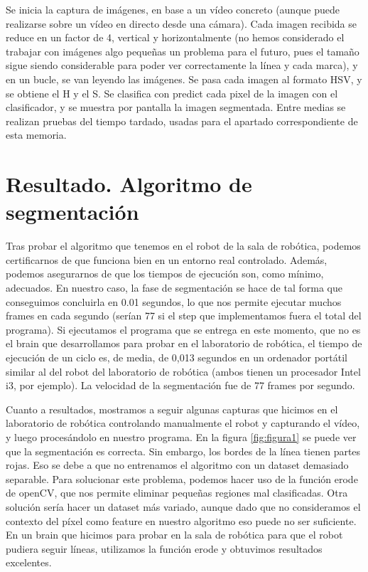 \documentclass{article}
\begin{document}
	Se inicia la captura de imágenes, en base a un vídeo concreto (aunque puede realizarse sobre un vídeo en directo desde una cámara). Cada imagen recibida se reduce en un factor de 4, vertical y horizontalmente (no hemos considerado el trabajar con imágenes algo pequeñas un problema para el futuro, pues el tamaño sigue siendo considerable para poder ver correctamente la línea y cada marca), y en un bucle, se van leyendo las imágenes. Se pasa cada imagen al formato HSV, y se obtiene el H y el S. Se clasifica con predict cada pixel de la imagen con el clasificador, y se muestra por pantalla la imagen segmentada. Entre medias se realizan pruebas del tiempo tardado, usadas para el apartado correspondiente de esta memoria.


\section{Resultado. Algoritmo de segmentación}
	Tras probar el algoritmo que tenemos en el robot de la sala de robótica, podemos certificarnos de que funciona bien en un entorno real controlado. Además, podemos asegurarnos de que los tiempos de ejecución son, como mínimo, adecuados. En nuestro caso, la fase de segmentación se hace de tal forma que conseguimos concluirla en 0.01 segundos, lo que nos permite ejecutar muchos frames en cada segundo (serían 77 si el step que implementamos fuera el total del programa). Si ejecutamos el programa que se entrega en este momento, que no es el brain que desarrollamos para probar en el laboratorio de robótica, el tiempo de ejecución de un ciclo es, de media, de 0,013 segundos en un ordenador portátil similar al del robot del laboratorio de robótica (ambos tienen un procesador Intel i3, por ejemplo). La velocidad de la segmentación fue de 77 frames por segundo.

	Cuanto a resultados, mostramos a seguir algunas capturas que hicimos en el laboratorio de robótica controlando manualmente el robot y capturando el vídeo, y luego procesándolo en nuestro programa. En la figura \ref{fig:figura1} se puede ver que la segmentación es correcta. Sin embargo, los bordes de la línea tienen partes rojas. Eso se debe a que no entrenamos el algoritmo con un dataset demasiado separable. Para solucionar este problema, podemos hacer uso de la función erode de openCV, que nos permite eliminar pequeñas regiones mal clasificadas. Otra solución sería hacer un dataset más variado, aunque dado que no consideramos el contexto del píxel como feature en nuestro algoritmo eso puede no ser suficiente. En un brain que hicimos para probar en la sala de robótica para que el robot pudiera seguir líneas, utilizamos la función erode y obtuvimos resultados excelentes.
\end{document}

